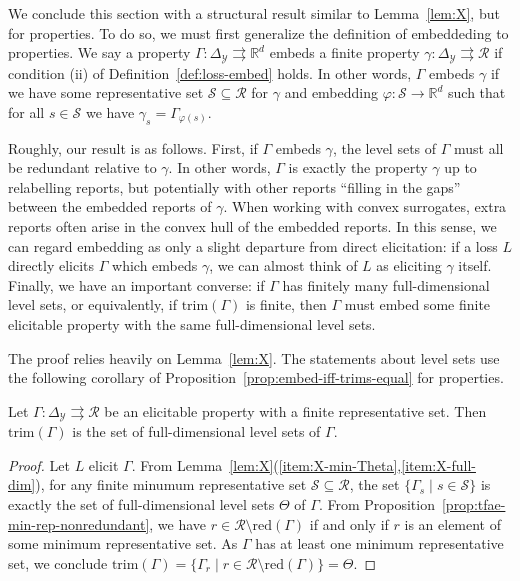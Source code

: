 \documentclass[twoside,11pt]{article}
\newcommand{\reals}{\mathbb{R}}
\newcommand{\simplex}{\Delta_\Y}
\newcommand{\R}{\mathcal{R}}
\newcommand{\Sc}{\mathcal{S}}
\newcommand{\Y}{\mathcal{Y}}
\newcommand{\toto}{\rightrightarrows}
\newcommand{\red}{\mathrm{red}}
\newcommand{\trimred}{\mathrm{trim}}
\begin{document}
We conclude this section with a structural result similar to Lemma~\ref{lem:X}, but for properties.
To do so, we must first generalize the definition of embeddeding to properties.
We say a property $\Gamma:\simplex\toto\reals^d$ embeds a finite property $\gamma:\simplex\toto\R$ if condition (ii) of Definition~\ref{def:loss-embed} holds.
In other words, $\Gamma$ embeds $\gamma$ if we have some representative set $\Sc\subseteq\R$ for $\gamma$ and embedding $\varphi:\Sc\to\reals^d$ such that for all $s\in\Sc$ we have $\gamma_s = \Gamma_{\varphi(s)}$.

Roughly, our result is as follows.
First, if $\Gamma$ embeds $\gamma$, the level sets of $\Gamma$ must all be redundant relative to $\gamma$.
In other words, $\Gamma$ is exactly the property $\gamma$ up to relabelling reports, but potentially with other reports ``filling in the gaps'' between the embedded reports of $\gamma$.
When working with convex surrogates, extra reports often arise in the convex hull of the embedded reports.
In this sense, we can regard embedding as only a slight departure from direct elicitation: if a loss $L$ directly elicits $\Gamma$ which embeds $\gamma$, we can almost think of $L$ as eliciting $\gamma$ itself.
Finally, we have an important converse: if $\Gamma$ has finitely many full-dimensional level sets, or equivalently, if $\trimred(\Gamma)$ is finite, then $\Gamma$ must embed some finite elicitable property with the same full-dimensional level sets.

The proof relies heavily on Lemma~\ref{lem:X}.
The statements about level sets use the following corollary of Proposition~\ref{prop:embed-iff-trims-equal} for properties.
\begin{corollary}\label{cor:trim-prop-red}
  Let $\Gamma : \simplex \toto \R$ be an elicitable property with a finite representative set.
  Then $\trimred(\Gamma)$ is the set of full-dimensional level sets of $\Gamma$.
\end{corollary}
\begin{proof}
  Let $L$ elicit $\Gamma$.
  From Lemma~\ref{lem:X}(\ref{item:X-min-Theta},\ref{item:X-full-dim}), for any finite minumum representative set $\Sc\subseteq\R$, the set $\{\Gamma_s\mid s\in\Sc\}$ is exactly the set of full-dimensional level sets $\Theta$ of $\Gamma$.
  From Proposition~\ref{prop:tfae-min-rep-nonredundant}, we have $r \in \R\setminus \red(\Gamma)$ if and only if $r$ is an element of some minimum representative set.
  As $\Gamma$ has at least one minimum representative set, we conclude $\trimred(\Gamma) = \{\Gamma_r \mid r\in \R\setminus\red(\Gamma)\} = \Theta$.  
\end{proof}
\end{document}
